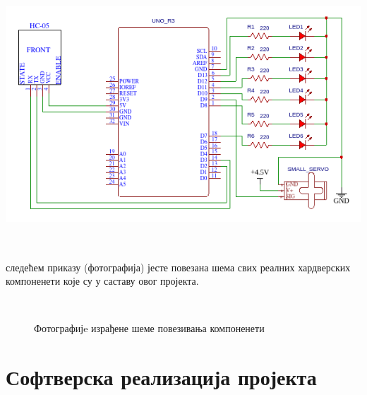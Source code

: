 \documentclass[12pt]{article}
\begin{document}
\begin{center}
    \centering 
    \includegraphics[height=10cm, width=15cm]{images/sema_easyeda.png}
\end{center}
\vspace{0.5cm}
\indent{} следећем приказу (фотографија) јесте повезана шема свих реалних хардверских компоненети које су у саставу овог пројекта.
\begin{figure}[H]
\centering
{}
\vspace{0.5cm}\\
\hfill %
\caption{Фотографијe израђене шеме повезивања компоненети}
\end{figure}


\newpage
\section{Софтверска реализација пројекта}
\end{document}
